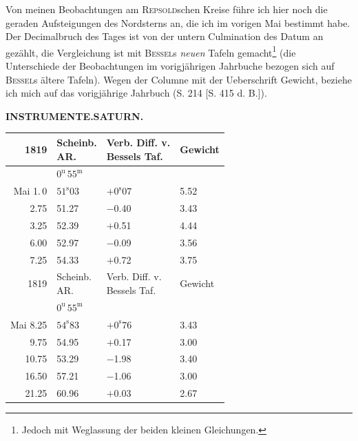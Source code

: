 \par\indent Von meinen Beobachtungen am \textsc{Repsold}schen Kreise führe ich hier noch die geraden
Aufsteigungen des Nordsterns an, die ich im vorigen Mai bestimmt habe. Der Decimalbruch des Tages ist
von der untern Culmination des Datum an gezählt, 
die Vergleichung ist mit \textsc{Bessel}s \emph{neuen} Tafeln gemacht\footnote{Jedoch mit
Weglassung der beiden kleinen Gleichungen.} (die Unterschiede der Beobachtungen im vorigjährigen
Jahrbuche bezogen sich auf \textsc{Bessel}s ältere Tafeln). Wegen der Columne mit der Ueberschrift
Gewicht, beziehe ich mich auf das vorigjährige Jahrbuch (S. 214 [S. 415 d. B.]).

\clearpage
\noindent{}%
%
\parbox[t]{\dimexpr\linewidth-24mm\relax}{\centering\footnotesize\bfseries INSTRUMENTE.\enspace SATURN.\par}%
\makebox[12mm][r]{}\par\nobreak\medskip
\begin{center}
\begin{tabular}{r|l|l|l}
1819  &  \shortstack{Scheinb.\\AR.}  &  \shortstack{Verb. Diff. v.\\Bessels Taf.}  &  Gewicht  \\
\hline
 &  $0^{\mathrm u}\,55^{\mathrm m}$  &   &   \\
Mai 1.\,0  &  $51^{\mathrm s}03$  &  $+0^{\mathrm s}07$  &  5.52  \\
2.75  &  51.27  &  $-$0.40  &  3.43  \\
3.25  &  52.39  &  $+$0.51  &  4.44  \\
6.00  &  52.97  &  $-$0.09  &  3.56  \\
7.25  &  54.33  &  $+$0.72  &  3.75  \\
\hline
 1819  &  \shortstack{Scheinb.\\AR.}  &  \shortstack{Verb. Diff. v.\\Bessels Taf.}  &  Gewicht  \\
\hline
  &  $0^{\mathrm u}\,55^{\mathrm m}$  &   &   \\
 Mai 8.25  &  $54^{\mathrm s}83$  &  $+0^{\mathrm s}76$  &  3.43  \\
 9.75  &  54.95  &  $+$0.17  &  3.00  \\
 10.75  &  53.29  &  $-$1.98  &  3.40  \\
 16.50  &  57.21  &  $-$1.06  &  3.00  \\
 21.25  &  60.96  &  $+$0.03  &  2.67  \\
\end{tabular}
\end{center}


